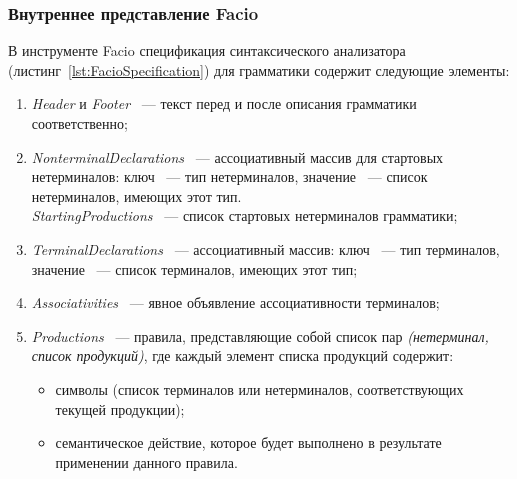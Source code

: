\documentclass[14pt]{matmex-diploma}
\begin{document}
\subsubsection{Внутреннее представление Facio}
В инструменте Facio спецификация синтаксического анализатора (листинг~\ref{lst:FacioSpecification}) для грамматики содержит следующие элементы:
\begin{enumerate}
\item
\textit{Header} и \textit{Footer} ~--- текст перед и после описания грамматики соответственно;
\item
\textit{NonterminalDeclarations} ~--- ассоциативный массив для стартовых нетерминалов: ключ ~--- тип нетерминалов, значение ~--- список нетерминалов, имеющих этот тип. \\\textit{StartingProductions} ~--- список стартовых нетерминалов грамматики;
\item
\textit{TerminalDeclarations} ~--- ассоциативный массив: ключ ~--- тип терминалов, значение ~--- список терминалов, имеющих этот тип;
\item
\textit{Associativities} ~--- явное объявление ассоциативности терминалов;
\item
\textit{Productions} ~--- правила, представляющие собой список пар \textit{(нетерминал, список продукций)}, где каждый элемент списка продукций содержит:
  \begin{itemize}
  \item
  символы (список терминалов или нетерминалов, соответствующих текущей продукции);
  \item
  семантическое действие, которое будет выполнено в результате применении данного правила.
  \end{itemize}
\end{enumerate}

\end{document}
